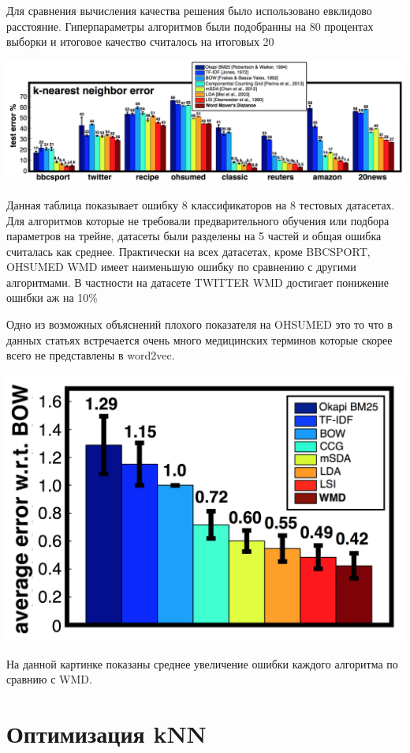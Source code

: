 \documentclass[10pt,reqno]{amsart}
\theoremstyle{definition}
\theoremstyle{remark}
\begin{document}
Для сравнения вычисления качества решения было использовано евклидово расстояние. Гиперпараметры алгоритмов были подобранны на 80 процентах выборки и итоговое качество считалось на итоговых 20

\includegraphics[width=1 \textwidth]{3.png}


Данная таблица показывает ошибку 8 классификаторов на 8 тестовых датасетах. Для алгоритмов которые не требовали предварительного обучения или подбора параметров на трейне, датасеты были разделены на 5 частей и общая ошибка считалась как среднее. Практически на всех датасетах, кроме BBCSPORT, OHSUMED WMD  имеет наименьшую ошибку по сравнению с другими алгоритмами. В частности на датасете TWITTER WMD достигает понижение ошибки аж на 10\%

Одно из возможных объяснений плохого показателя на OHSUMED это то что в данных статьях встречается очень много медицинских терминов которые скорее всего не представлены в word2vec.

\includegraphics[width=1 \textwidth]{4.png}

На данной картинке показаны среднее увеличение ошибки каждого алгоритма по сравнию с WMD.



\section{Оптимизация kNN}
\end{document}
